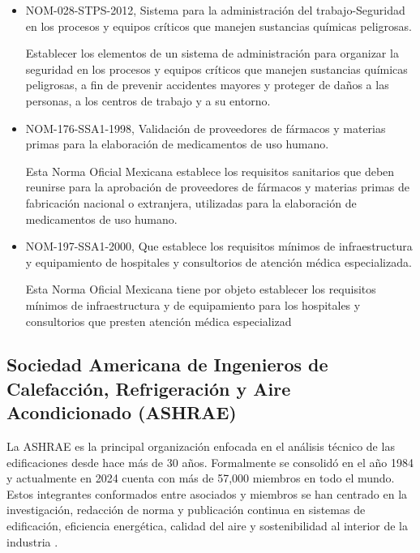 \begin{enumerate}
\begin{itemize}
			\item NOM-028-STPS-2012, Sistema para la administración del trabajo-Seguridad en los procesos y equipos críticos que manejen sustancias químicas peligrosas.
			
			Establecer los elementos de un sistema de administración para organizar la seguridad en los procesos y equipos críticos que manejen sustancias químicas peligrosas, a fin de prevenir accidentes mayores y proteger de daños a las personas, a los centros de trabajo y a su entorno.
			
			\item	NOM-176-SSA1-1998, Validación de proveedores de fármacos y materias primas para la elaboración de medicamentos de uso humano.
			
			Esta Norma Oficial Mexicana establece los requisitos sanitarios que deben reunirse para la aprobación de proveedores de fármacos y materias primas de fabricación nacional o extranjera, utilizadas para la elaboración de medicamentos de uso humano.
			
			\item NOM-197-SSA1-2000, Que establece los requisitos mínimos de infraestructura y equipamiento de hospitales y consultorios de atención médica especializada.
			
			Esta Norma Oficial Mexicana tiene por objeto establecer los requisitos mínimos de infraestructura y de equipamiento para los hospitales y consultorios que presten atención médica especializad
			
					
		\end{itemize}	
\end{enumerate}

\subsection{Sociedad Americana de Ingenieros de Calefacción, Refrigeración y Aire Acondicionado (ASHRAE)}

La ASHRAE es la principal organización enfocada en el análisis técnico de las edificaciones desde hace más de 30 años. Formalmente se consolidó en el año 1984 y actualmente en 2024 cuenta con más de 57,000 miembros en todo el mundo. Estos integrantes conformados entre asociados y miembros se han centrado en la investigación, redacción de norma y publicación continua en sistemas de edificación, eficiencia energética, calidad del aire y sostenibilidad al interior de la industria \cite{ashrae-about}.


